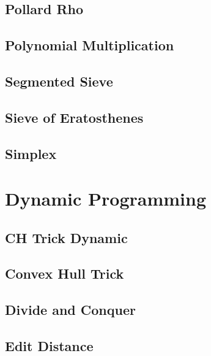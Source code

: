 \subsection{Pollard Rho}
\raggedbottom
\hrulefill
\subsection{Polynomial Multiplication}
\raggedbottom
\hrulefill
\subsection{Segmented Sieve}
\raggedbottom
\hrulefill
\subsection{Sieve of Eratosthenes}
\raggedbottom
\hrulefill
\subsection{Simplex}
\raggedbottom
\hrulefill

\section{Dynamic Programming}
\subsection{CH Trick Dynamic}
\raggedbottom
\hrulefill
\subsection{Convex Hull Trick}
\raggedbottom
\hrulefill
\subsection{Divide and Conquer}
\raggedbottom
\hrulefill
\subsection{Edit Distance}
\raggedbottom
\hrulefill

